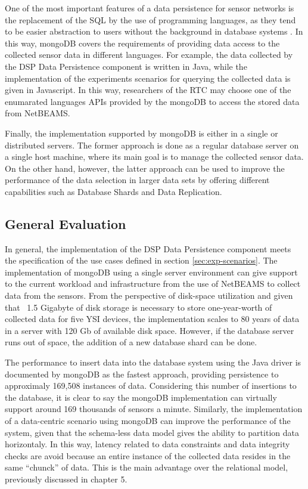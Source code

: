 One of the most important features of a data persistence for sensor
networks is the replacement of the SQL by the use of programming
languages, as they tend to be easier abstraction to users without the
background in database systems \cite{sn-programming-language}. In this way,
mongoDB covers the requirements of providing data access to the collected
sensor data in different languages. For example, the data collected by the DSP
Data Persistence component is written in Java, while the implementation of the
experiments scenarios for querying the collected data is given in Javascript. In
this way, researchers of the RTC may choose one of the enumarated languages
APIs provided by the mongoDB to access the stored data from NetBEAMS.

Finally, the implementation supported by mongoDB is either in a single or
distributed servers. The former approach is done as a regular database server
on a single host machine, where its main goal is to manage the collected sensor
data. On the other hand, however, the latter approach can be used to improve
the performance of the data selection in larger data sets by offering different
capabilities such as Database Shards and Data Replication.

\subsection{General Evaluation}

In general, the implementation of the DSP Data Persistence component meets
the specification of the use cases defined in section \ref{sec:exp-scenarios}.
The implementation of mongoDB using a single server environment can give
support to the current workload and infrastructure from the use of NetBEAMS to
collect data from the sensors. From the perspective of disk-space utilization
and given that ~1.5 Gigabyte of disk storage is necessary to store
one-year-worth of collected data for five YSI devices, the implementation
scales to 80 years of data in a server with 120 Gb of available disk space.
However, if the database server runs out of space, the addition of a new
database shard can be done.

The performance to insert data into the database system using the Java driver
is documented by mongoDB as the fastest approach, providing persistence to
approximaly 169,508 instances of data. Considering this number of insertions to
the database, it is clear to say the mongoDB implementation can virtually
support around 169 thousands of sensors a minute. Similarly, the implementation
of a data-centric scenario using mongoDB can improve the performance of the
system, given that the schema-less data model gives the ability to partition
data horizontaly. In this way, latency related to data constraints and data
integrity checks are avoid because an entire instance of the collected data
resides in the same ``chunck'' of data. This is the main advantage over the
relational model, previously discussed in chapter 5.

